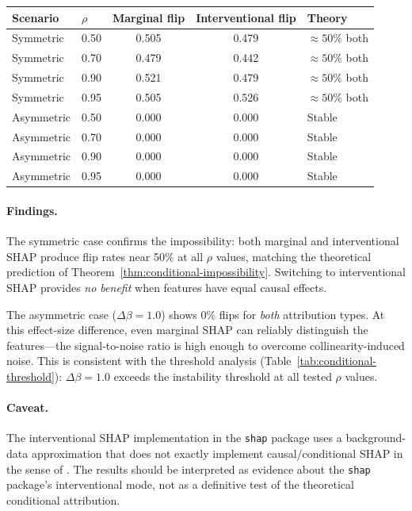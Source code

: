 \documentclass{article}
\begin{document}
\begin{center}
\small
\begin{tabular}{@{}llccl@{}}
\toprule
Scenario & $\rho$ & Marginal flip & Interventional flip & Theory \\
\midrule
Symmetric  & 0.50 & 0.505 & 0.479 & ${\approx}50\%$ both \\
Symmetric  & 0.70 & 0.479 & 0.442 & ${\approx}50\%$ both \\
Symmetric  & 0.90 & 0.521 & 0.479 & ${\approx}50\%$ both \\
Symmetric  & 0.95 & 0.505 & 0.526 & ${\approx}50\%$ both \\
\midrule
Asymmetric & 0.50 & 0.000 & 0.000 & Stable \\
Asymmetric & 0.70 & 0.000 & 0.000 & Stable \\
Asymmetric & 0.90 & 0.000 & 0.000 & Stable \\
Asymmetric & 0.95 & 0.000 & 0.000 & Stable \\
\bottomrule
\end{tabular}
\end{center}

\paragraph{Findings.}
The symmetric case confirms the impossibility: both marginal and
interventional SHAP produce flip rates near 50\% at all $\rho$ values,
matching the theoretical prediction of
Theorem~\ref{thm:conditional-impossibility}. Switching to interventional
SHAP provides \emph{no benefit} when features have equal causal effects.

The asymmetric case ($\Delta\beta = 1.0$) shows 0\% flips for
\emph{both} attribution types. At this effect-size difference, even
marginal SHAP can reliably distinguish the features---the
signal-to-noise ratio is high enough to overcome collinearity-induced
noise. This is consistent with the threshold analysis
(Table~\ref{tab:conditional-threshold}): $\Delta\beta = 1.0$ exceeds
the instability threshold at all tested $\rho$ values.

\paragraph{Caveat.}
The interventional SHAP implementation in the \texttt{shap} package
uses a background-data approximation that does not exactly implement
causal/conditional SHAP in the sense of \cite{janzing2020feature}.
The results should be interpreted as evidence about the \texttt{shap}
package's interventional mode, not as a definitive test of the
theoretical conditional attribution.
\end{document}
